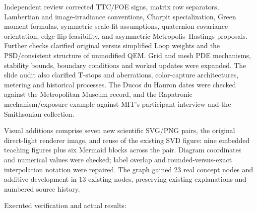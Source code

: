 Independent review corrected TTC/FOE signs, matrix row separators, Lambertian and image-irradiance conventions, Charpit specialization, Green moment formulas, symmetric scale-fit assumptions, quaternion covariance orientation, edge-flip feasibility, and asymmetric Metropolis--Hastings proposals. Further checks clarified original versus simplified Loop weights and the PSD/consistent structure of unmodified QEM. Grid and mesh PDE mechanisms, stability bounds, boundary conditions and worked updates were expanded. The slide audit also clarified T-stops and aberrations, color-capture architectures, metering and historical processes. The Ducos du Hauron dates were checked against the Metropolitan Museum record, and the Rapatronic mechanism/exposure example against MIT's participant interview and the Smithsonian collection.

Visual additions comprise seven new scientific SVG/PNG pairs, the original direct-light renderer image, and reuse of the existing SVD figure: nine embedded teaching figures plus six Mermaid blocks across the pair. Diagram coordinates and numerical values were checked; label overlap and rounded-versus-exact interpolation notation were repaired. The graph gained 23 real concept nodes and additive development in 13 existing nodes, preserving existing explanations and numbered source history.

Executed verification and actual results:

